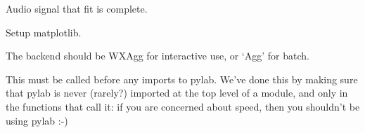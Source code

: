 \documentclass[letterpaper,10pt,english]{sphinxmanual}
\begin{document}

\begin{fulllineitems}
\label{api/cli:refl1d.cli.beep}
Audio signal that fit is complete.

\end{fulllineitems}


\begin{fulllineitems}
\label{api/cli:refl1d.cli.config_matplotlib}
Setup matplotlib.

The backend should be WXAgg for interactive use, or `Agg' for batch.

This must be called before any imports to pylab.  We've done this by
making sure that pylab is never (rarely?) imported at the top level
of a module, and only in the functions that call it: if you are
concerned about speed, then you shouldn't be using pylab :-)

\end{fulllineitems}


\begin{fulllineitems}
\label{api/cli:refl1d.cli.getopts}
\end{fulllineitems}


\begin{fulllineitems}
\label{api/cli:refl1d.cli.initial_model}
\end{fulllineitems}


\begin{fulllineitems}
\label{api/cli:refl1d.cli.load_problem}
\end{fulllineitems}


\begin{fulllineitems}
\label{api/cli:refl1d.cli.main}
\end{fulllineitems}
\end{document}
